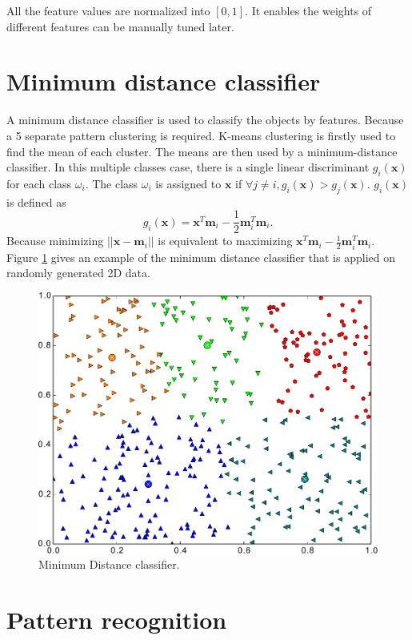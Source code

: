 \documentclass[paper=a4, fontsize=11pt]{scrartcl}
\begin{document}
All the feature values are normalized into $ [0, 1] $.
It enables the weights of different features can be manually tuned later.


\section{Minimum distance classifier}
\label{sec:classifier}

A minimum distance classifier is used to classify the objects by features.
Because a 5 separate pattern clustering is required.
K-means clustering is firstly used to find the mean of each cluster.
The means are then used by a minimum-distance classifier.
In this multiple classes case, there is a single linear discriminant $ g_{i} ( \mathbf{x} ) $ for each class $ \omega_{i} $.
The class $ \omega_{i} $ is assigned to $ \mathbf{x} $ if $ \forall j \neq i, g_{i} ( \mathbf{x} ) > g_{j} ( \mathbf{x} ) $.
$ g_{i}( \mathbf{x} ) $ is defined as 
\begin{equation}
g_{i}( \mathbf{x} ) = \mathbf{x}^{T} \mathbf{m}_{i} - \frac{1}{2} \mathbf{m}_{i}^{T} \mathbf{m}_{i}.
\end{equation}
Because minimizing $ || \mathbf{x} - \mathbf{m}_{i} || $ is equivalent to maximizing $ \mathbf{x}^{T} \mathbf{m}_{i} - \frac{1}{2} \mathbf{m}_{i}^{T} \mathbf{m}_{i} $.
Figure \ref{fig:min_dist_classifer} gives an example of the minimum distance classifier that is applied on randomly generated 2D data.

\begin{figure}
\centering
\includegraphics[width=0.7\linewidth]{./figure/kmean}
\caption{Minimum Distance classifier.}
\label{fig:min_dist_classifer}
\end{figure}

\section{Pattern recognition}
\label{sec:pattern_recognition}
\end{document}
